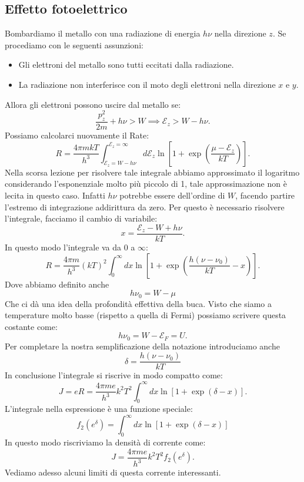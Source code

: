 \subsection{Effetto fotoelettrico}%
Bombardiamo il metallo con una radiazione di energia $h \nu $ nella direzione $z$. Se procediamo con le seguenti assunzioni:
\begin{itemize}
    \item Gli elettroni del metallo sono tutti eccitati dalla radiazione.
    \item La radiazione non interferisce con il moto degli elettroni nella direzione $x$ e $y$.
\end{itemize}
Allora gli elettroni possono uscire dal metallo se:
\[
	\frac{p_{z}^2}{2m} + h\nu > W \implies \mathcal{E}_z > W - h\nu
.\] 
Possiamo calcolarci nuovamente il Rate:
\[
	R = \frac{4\pi m kT}{h^3}\int_{\mathcal{E} _{z} = W - h\nu }^{\mathcal{E}_{z}=\infty} d\mathcal{E} _{z} \ln\left[ 1 +\exp\left( \frac{\mu -\mathcal{E} _{z}}{kT} \right)  \right] 
.\] 
Nella scorsa lezione per risolvere tale integrale abbiamo approssimato il logaritmo considerando l'esponenziale molto più piccolo di 1, tale approssimazione non è lecita in questo caso. Infatti $h\nu $ potrebbe essere dell'ordine di $W$, facendo partire l'estremo di integrazione addirittura da zero. Per questo è necessario risolvere l'integrale, facciamo il cambio di variabile:
\[
	x = \frac{\mathcal{E} _{z} - W + h\nu }{kT}
.\] 
In questo modo l'integrale va da $0$ a $\infty$:
\[
	R = \frac{4\pi m }{h^3} \left( kT \right) ^2 \int_{0}^{\infty} dx \ln\left[ 1+\exp\left( \frac{h\left( \nu -\nu_0 \right) }{kT} - x \right)  \right]  
.\] 
Dove abbiamo definito anche 
\[
	h\nu_0=W-\mu 
\]
Che ci dà una idea della profondità effettiva della buca. Visto che siamo a temperature molto basse (rispetto a quella di Fermi) possiamo scrivere questa costante come:
\[
	h\nu_0 = W - \mathcal{E}_{F} = U
.\] 
Per completare la nostra semplificazione della notazione introduciamo anche
\[
	\delta = \frac{h\left( \nu -\nu_0 \right) }{kT}
\]
In conclusione l'integrale si riscrive in modo compatto come:
\[
	J = eR = \frac{4\pi m e}{h^3} k^2T^2 \int_{0}^{\infty} dx \ln\left[ 1 + \exp\left( \delta -x \right)  \right]  
.\] 
L'integrale nella espressione è una funzione speciale:
\[
	f_{2}(e^{\delta}) = \int_{0}^{\infty} dx \ln\left[ 1 + \exp\left( \delta - x \right)  \right]  
\]
In questo modo riscriviamo la densità di corrente come:
\[
	J =  \frac{4\pi m e}{h^3} k^2T^2 f_2(e^{\delta }) 
.\] 
Vediamo adesso alcuni limiti di questa corrente interessanti.
